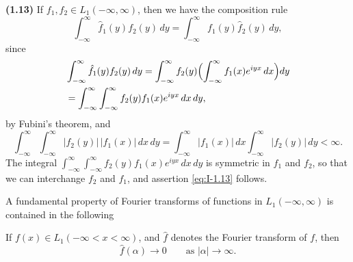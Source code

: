 \noindent\textbf{(1.13)} If $f_1,f_2\in L_1(-\infty,\infty)$, then we have the composition rule
\begin{equation}\label{eq:I-1.13}
\int_{-\infty}^{\infty}\hat f_1(y)f_2(y)\,dy
=\int_{-\infty}^{\infty}f_1(y)\hat f_2(y)\,dy,
\end{equation}
since
\begin{align*}
&\int_{-\infty}^{\infty}\hat f_1(y)f_2(y)\,dy
=\int_{-\infty}^{\infty}f_2(y)\Bigl(\int_{-\infty}^{\infty}f_1(x)e^{iyx}\,dx\Bigr)dy\\
&=\int_{-\infty}^{\infty}\int_{-\infty}^{\infty}f_2(y)f_1(x)e^{iyx}\,dx\,dy,
\end{align*}
by Fubini's theorem, and
\begin{equation*}
\int_{-\infty}^{\infty}\int_{-\infty}^{\infty}|f_2(y)|\,|f_1(x)|\,dx\,dy
=\int_{-\infty}^{\infty}|f_1(x)|\,dx\int_{-\infty}^{\infty}|f_2(y)|\,dy<\infty.
\end{equation*}
The integral $\int_{-\infty}^{\infty}\int_{-\infty}^{\infty}f_2(y)f_1(x)e^{iyx}\,dx\,dy$ is symmetric in $f_1$ and $f_2$, so that we can interchange $f_2$ and $f_1$, and assertion \eqref{eq:I-1.13} follows.

A fundamental property of Fourier transforms of functions in $L_1(-\infty,\infty)$ is contained in the following

\begin{theorem}\label{thm:I-1}
If $f(x)\in L_1(-\infty<x<\infty)$, and $\hat f$ denotes the Fourier transform of $f$, then
\begin{equation*}
\widehat f(\alpha)\to 0\qquad\text{as }|\alpha|\to\infty.
\end{equation*}
\end{theorem}

